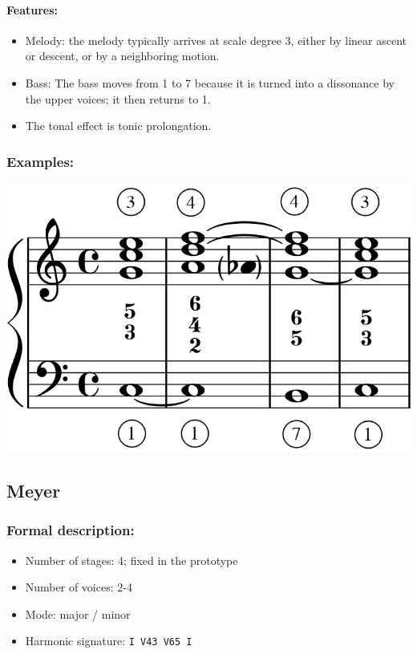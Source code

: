 \documentclass[11pt, openany]{article}
\begin{document}
\paragraph{Features:}
\begin{itemize}
\item Melody: the melody typically arrives at scale degree 3, either by linear ascent or descent, or by a neighboring motion.
\item Bass: The bass moves from 1 to 7 because it is turned into a dissonance by the upper voices; it then returns to 1.
\item The tonal effect is tonic prolongation.

\end{itemize}

\subsubsection{Examples:}
\begin{center}
\includegraphics[scale=0.3]{lully.png}
\end{center}


	\subsection{Meyer}
	
\subsubsection{Formal description:}
\begin{itemize}
\item Number of stages: 4; fixed in the prototype
\item Number of voices: 2-4
\item Mode: major / minor
\item Harmonic signature: \texttt{I V43 V65 I}
\end{itemize}
\end{document}
